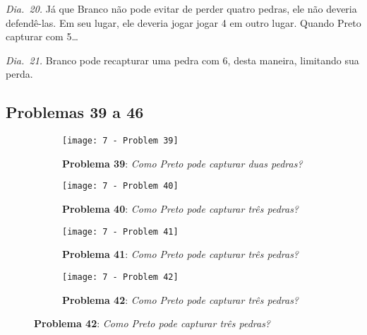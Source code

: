 \emph{Dia.\@~20.} Já que Branco não pode evitar de perder quatro pedras, ele não deveria defendê-las. Em seu lugar, ele deveria jogar jogar 4 em outro lugar. Quando Preto capturar com 5\ldots

\emph{Dia.\@~21.} Branco pode recapturar uma pedra com 6, desta maneira, limitando sua perda.

\pagebreak

\subsection{Problemas 39 a 46}

\begin{figure}[h!]
    \centering
    \begin{subfigure}[t]{.35\textwidth}
        \texttt{[image: 7 - Problem 39]}
        \caption*{\textbf{Problema 39}: \emph{Como Preto pode capturar duas pedras?}}
    \end{subfigure}
    \hspace{1.5cm}
    \begin{subfigure}[t]{.35\textwidth}
        \texttt{[image: 7 - Problem 40]}
        \caption*{\textbf{Problema 40}: \emph{Como Preto pode capturar três pedras?}}
    \end{subfigure}
    \par\bigskip
    \begin{subfigure}[t]{.35\textwidth}
        \texttt{[image: 7 - Problem 41]}
        \caption*{\textbf{Problema 41}: \emph{Como Preto pode capturar três pedras?}}
    \end{subfigure}
    \hspace{1.5cm}
    \begin{subfigure}[t]{.35\textwidth}
        \texttt{[image: 7 - Problem 42]}
        \caption*{\textbf{Problema 42}: \emph{Como Preto pode capturar três pedras?}}
    \end{subfigure}
\end{figure}

\pagebreak

